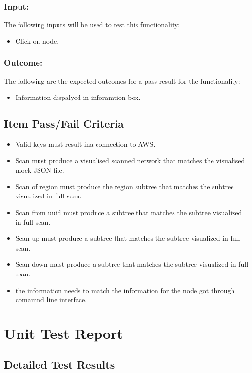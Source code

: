 \documentclass[hidelinks,a4paper,12pt]{article}
\begin{document}
\subsubsection{Input:}
 The following inputs will be used to test this functionality:
\begin{itemize}
  \item Click on node.
  

\end{itemize}

\subsubsection{Outcome: }
The following are the expected outcomes for a pass result for the functionality:
\begin{itemize}
\item Information dispalyed in inforamtion box.

\end{itemize}

\subsection{Item Pass/Fail Criteria}

\begin{itemize}
\item Valid keys must result ina connection to AWS.
\item Scan must produce a visualised scanned network that matches the visualised mock JSON file.
\item Scan of region must produce the region subtree that matches the subtree visualized in full scan.
\item Scan from uuid must produce a  subtree that matches the subtree visualized in full scan.
\item Scan up  must produce a subtree that matches the subtree visualized in full scan.
\item Scan down  must produce a subtree that matches the subtree visualized in full scan.
\item the information needs to match the information for the node got through comamnd line interface.
\end{itemize}
\newpage
\section{Unit Test Report}

\subsection{Detailed Test Results}
\end{document}
